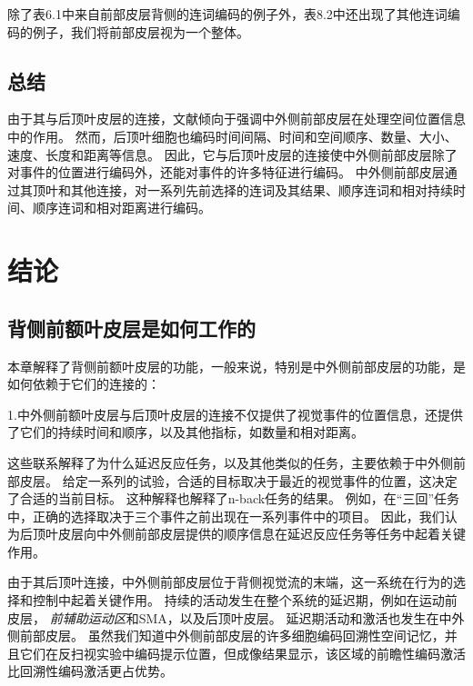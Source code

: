 除了表6.1中来自前部皮层背侧的连词编码的例子外，表8.2中还出现了其他连词编码的例子，我们将前部皮层视为一个整体。



\subsection{总结}

由于其与后顶叶皮层的连接，文献倾向于强调中外侧前部皮层在处理空间位置信息中的作用。
然而，后顶叶细胞也编码时间间隔、时间和空间顺序、数量、大小、速度、长度和距离等信息。
因此，它与后顶叶皮层的连接使中外侧前部皮层除了对事件的位置进行编码外，还能对事件的许多特征进行编码。
中外侧前部皮层通过其顶叶和其他连接，对一系列先前选择的连词及其结果、顺序连词和相对持续时间、顺序连词和相对距离进行编码。



\section{结论}

\subsection{背侧前额叶皮层是如何工作的}

本章解释了背侧前额叶皮层的功能，一般来说，特别是中外侧前部皮层的功能，是如何依赖于它们的连接的：
\par

1.中外侧前额叶皮层与后顶叶皮层的连接不仅提供了视觉事件的位置信息，还提供了它们的持续时间和顺序，以及其他指标，如数量和相对距离。


这些联系解释了为什么延迟反应任务，以及其他类似的任务，主要依赖于中外侧前部皮层。
给定一系列的试验，合适的目标取决于最近的视觉事件的位置，这决定了合适的当前目标。
这种解释也解释了n-back任务的结果。
例如，在“三回”任务中，正确的选择取决于三个事件之前出现在一系列事件中的项目。
因此，我们认为后顶叶皮层向中外侧前部皮层提供的顺序信息在延迟反应任务等任务中起着关键作用。


由于其后顶叶连接，中外侧前部皮层位于背侧视觉流的末端，这一系统在行为的选择和控制中起着关键作用。
持续的活动发生在整个系统的延迟期，例如在运动前皮层\cite{wise1985primate}， \textit{前辅助运动区}和SMA\cite{shima2000neuronal}，以及后顶叶皮层\cite{kalaska1995deciding}。
延迟期活动和激活也发生在中外侧前部皮层。
虽然我们知道中外侧前部皮层的许多细胞编码回溯性空间记忆\cite{genovesio2006neuronal}，并且它们在反扫视实验中编码提示位置\cite{funahashi1993prefrontal}，但成像结果显示，该区域的前瞻性编码激活比回溯性编码激活更占优势。
\par


